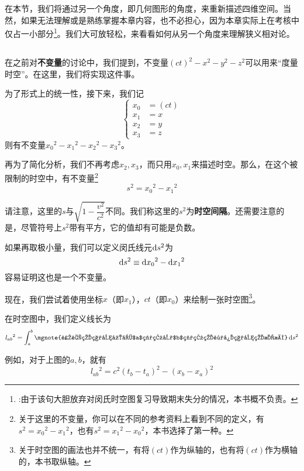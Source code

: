 \section[相对论的几何表述]{ }
在本节，我们将通过另一个角度，即几何图形的角度，来重新描述四维空间。当然，如果无法理解或是熟练掌握本章内容，也不必担心，因为本章实际上在考核中仅占一小部分\footnote{\dove :由于该句大胆放弃对闵氏时空图复习导致期末失分的情况，本书概不负责。}。我们大可放轻松，来看看如何从另一个角度来理解狭义相对论。
\subsection[闵氏时空]{}
在之前对\textbf{不变量}的讨论中，我们提到，不变量$(ct)^2-x^2-y^2-z^2$可以用来``度量时空''。在这里，我们将实现这件事。

为了形式上的统一性，接下来，我们记
\[\left\{\begin{aligned}
        x_0 & =(ct) \\
        x_1 & =x    \\
        x_2 & =y    \\
        x_3 & =z
    \end{aligned}\right.\]
则有不变量$x_0{}^2-x_1{}^2-x_2{}^2-x_3{}^2$。

再为了简化分析，我们不再考虑$x_2,x_3$，而只用$x_0,x_1$来描述时空。那么，在这个被限制的时空中，有不变量\footnote{关于这里的不变量，你可以在不同的参考资料上看到不同的定义，有$s^2=x_0{}^2-x_1{}^2$，也有$s^2=x_1{}^2-x_0{}^2$，本书选择了第一种。}
\[s^2=x_0{}^2-x_1{}^2\]

请注意，这里的$s$与$\sqrt{1-\dfrac{v^2}{c^2}}$不同。我们称这里的$s^2$为\textbf{时空间隔}。还需要注意的是，尽管符号上$s^2$带有平方，它的值却有可能是负数。

如果再取极小量，我们可以定义闵氏线元$\dif s^2$为
\[\dif s^2\equiv \dif x_0{}^2-\dif x_1{}^2\]
容易证明这也是一个不变量。

现在，我们尝试着使用坐标$x$（即$x_1$），$ct$（即$x_0$）来绘制一张时空图\footnote{关于时空图的画法也并不统一，有将$(ct)$作为纵轴的，也有将$(ct)$作为横轴的，本书取纵轴。}。

在时空图中，我们定义线长为
\[l_{ab}{}^2=\int_{a}^{b}\mgnote{这里的积分应取$a$端点到$b$端点的路径积分的意思} \dif s^2\]

例如，对于上图的$a,b$，就有
\[l_{ab}{}^2=c^2(t_b-t_a)^2-(x_b-x_a)^2\]

